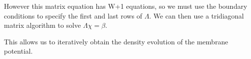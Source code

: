\documentclass[10pt]{article}
\begin{document}
However this matrix equation has W+1 equations, so we must use the
boundary conditions to specify the first and last rows of $\Lambda$.
We can then use a tridiagonal matrix algorithm to solve $\Lambda \chi
= \beta$.

This allows us to iteratively obtain the density evolution of the
membrane potential.

{  }
\end{document}
